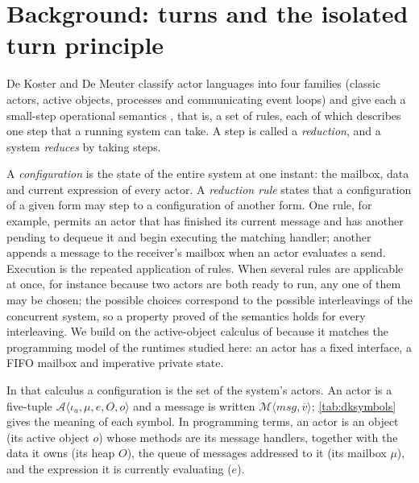 \documentclass[11pt]{article}
\theoremstyle{definition}
\theoremstyle{remark}
\newcommand{\Act}[1]{\mathcal{A}\langle #1\rangle}
\newcommand{\Msg}[1]{\mathcal{M}\langle #1\rangle}
\begin{document}
\section{Background: turns and the isolated turn principle}
\label{sec:background}

De Koster and De Meuter classify actor languages into four families (classic actors,
active objects, processes and communicating event loops) and give each a small-step
operational semantics \cite{dekoster2024}, that is, a set of rules, each of which
describes one step that a running system can take. A step is called a
\emph{reduction}, and a system \emph{reduces} by taking steps.

A \emph{configuration} is the state of the entire system at one instant: the mailbox,
data and current expression of every actor. A \emph{reduction rule} states that a
configuration of a given form may step to a configuration of another form. One rule, for
example, permits an actor that has finished its current message and has another pending
to dequeue it and begin executing the matching handler; another appends a message to the
receiver's mailbox when an actor evaluates a send. Execution is the repeated application
of rules. When several rules are applicable at once, for instance because two actors are
both ready to run, any one of them may be chosen; the possible choices correspond to the
possible interleavings of the concurrent system, so a property proved of the semantics
holds for every interleaving. We build on the active-object calculus of
\cite{dekoster2024} because it matches the programming model of the runtimes studied
here: an actor has a fixed interface, a FIFO mailbox and imperative private state.

In that calculus a configuration is the set of the system's actors. An actor is a
five-tuple $\Act{\iota_a, \mu, e, O, o}$ and a message is written $\Msg{msg,
\overline{v}}$; \cref{tab:dksymbols} gives the meaning of each symbol. In programming
terms, an actor is an object (its active object $o$) whose methods are its message
handlers, together with the data it owns (its heap $O$), the queue of messages addressed
to it (its mailbox $\mu$), and the expression it is currently evaluating ($e$).
\end{document}

